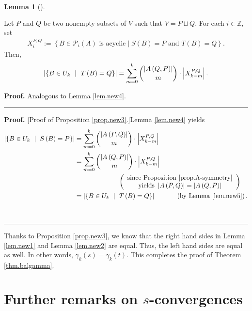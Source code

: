 \documentclass[numbers=enddot,12pt,final,onecolumn,notitlepage]{scrartcl}%
\theoremstyle{definition}
\newtheorem{lem}[theo]{Lemma}
\newenvironment{lemma}[1][]
{\begin{lem}[#1]\begin{leftbar}}
{\end{leftbar}\end{lem}}
\newenvironment{proof}[1][Proof]{\noindent\textbf{#1.} }{\ \rule{0.5em}{0.5em}}
\let\sumnonlimits\sum
\renewcommand{\sum}{\sumnonlimits\limits}
\theoremstyle{plainsl}
\begin{document}
\begin{lemma}
\label{lem.new5}
Let $P$ and $Q$ be two nonempty subsets of $V$ such that
$V=P\sqcup Q$.
For each $i \in \mathbb{Z}$, set
\begin{align*}
    X_i^{P,Q} := \left\{B \in \mathcal{P}_i(A) \text{ is acyclic} \mid S(B) = P \text{ and } T(B) = Q\right\}.
\end{align*}
Then,%
\[
\left\vert \left\{  B\in U_{k}\ \mid\ T\left(  B\right)  =Q\right\}
\right\vert =\sum_{m=0}^{k}\dbinom{\left\vert A\left(  Q,P\right)  \right\vert
}{m}\cdot\left\vert X_{k-m}^{P,Q}\right\vert .
\]

\end{lemma}

\begin{proof}
Analogous to Lemma \ref{lem.new4}.
\end{proof}

\begin{proof}
[Proof of Proposition \ref{prop.new3}.]Lemma \ref{lem.new4} yields%
\begin{align*}
\left\vert \left\{  B\in U_{k}\ \mid\ S\left(  B\right)  =P\right\}
\right\vert  &  =\sum_{m=0}^{k}\dbinom{\left\vert A\left(  P,Q\right)
\right\vert }{m}\cdot\left\vert X_{k-m}^{P,Q}\right\vert \\
&  =\sum_{m=0}^{k}\dbinom{\left\vert A\left(  Q,P\right)  \right\vert }%
{m}\cdot\left\vert X_{k-m}^{P,Q}\right\vert \\
&  \ \ \ \ \ \ \ \ \ \ \ \ \ \ \ \ \ \ \ \ \left(
\begin{array}
[c]{c}%
\text{since Proposition \ref{prop.A-symmetry}}\\
\text{yields }\left\vert A\left(  P,Q\right)  \right\vert =\left\vert A\left(
Q,P\right)  \right\vert
\end{array}
\right) \\
&  =\left\vert \left\{  B\in U_{k}\ \mid\ T\left(  B\right)  =Q\right\}
\right\vert \ \ \ \ \ \ \ \ \ \ \left(  \text{by Lemma \ref{lem.new5}}\right)
.
\end{align*}

\end{proof}

Thanks to Proposition \ref{prop.new3}, we know that the right hand sides in
Lemma \ref{lem.new1} and Lemma \ref{lem.new2} are equal. Thus, the left hand
sides are equal as well. In other words, $\gamma_{k}\left(  s\right)
=\gamma_{k}\left(  t\right)  $. This completes the proof of Theorem
\ref{thm.balgamma}.

\section{Further remarks on $s$-convergences}
\end{document}
